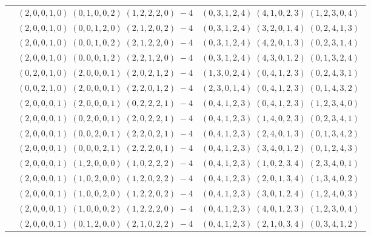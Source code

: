 \documentclass[11pt]{article}
\begin{document}
\begin{longtable}[l]{|c|c|c|}
 \cline{2-3} 
 & $(2 ,0 ,0 ,1 ,0) \;(0 ,1 ,0 ,0 ,2) \;(1 ,2 ,2 ,2 ,0) \;-4$ & $(0 ,3 ,1 ,2 ,4) \;(4 ,1 ,0 ,2 ,3) \;(1 ,2 ,3 ,0 ,4) \;$\\ 
 \cline{2-3} 
 & $(2 ,0 ,0 ,1 ,0) \;(0 ,0 ,1 ,2 ,0) \;(2 ,1 ,2 ,0 ,2) \;-4$ & $(0 ,3 ,1 ,2 ,4) \;(3 ,2 ,0 ,1 ,4) \;(0 ,2 ,4 ,1 ,3) \;$\\ 
 \cline{2-3} 
 & $(2 ,0 ,0 ,1 ,0) \;(0 ,0 ,1 ,0 ,2) \;(2 ,1 ,2 ,2 ,0) \;-4$ & $(0 ,3 ,1 ,2 ,4) \;(4 ,2 ,0 ,1 ,3) \;(0 ,2 ,3 ,1 ,4) \;$\\ 
 \cline{2-3} 
 & $(2 ,0 ,0 ,1 ,0) \;(0 ,0 ,0 ,1 ,2) \;(2 ,2 ,1 ,2 ,0) \;-4$ & $(0 ,3 ,1 ,2 ,4) \;(4 ,3 ,0 ,1 ,2) \;(0 ,1 ,3 ,2 ,4) \;$\\ 
 \cline{2-3} 
 & $(0 ,2 ,0 ,1 ,0) \;(2 ,0 ,0 ,0 ,1) \;(2 ,0 ,2 ,1 ,2) \;-4$ & $(1 ,3 ,0 ,2 ,4) \;(0 ,4 ,1 ,2 ,3) \;(0 ,2 ,4 ,3 ,1) \;$\\ 
 \cline{2-3} 
 & $(0 ,0 ,2 ,1 ,0) \;(2 ,0 ,0 ,0 ,1) \;(2 ,2 ,0 ,1 ,2) \;-4$ & $(2 ,3 ,0 ,1 ,4) \;(0 ,4 ,1 ,2 ,3) \;(0 ,1 ,4 ,3 ,2) \;$\\ 
 \cline{2-3} 
 & $(2 ,0 ,0 ,0 ,1) \;(2 ,0 ,0 ,0 ,1) \;(0 ,2 ,2 ,2 ,1) \;-4$ & $(0 ,4 ,1 ,2 ,3) \;(0 ,4 ,1 ,2 ,3) \;(1 ,2 ,3 ,4 ,0) \;$\\ 
 \cline{2-3} 
 & $(2 ,0 ,0 ,0 ,1) \;(0 ,2 ,0 ,0 ,1) \;(2 ,0 ,2 ,2 ,1) \;-4$ & $(0 ,4 ,1 ,2 ,3) \;(1 ,4 ,0 ,2 ,3) \;(0 ,2 ,3 ,4 ,1) \;$\\ 
 \cline{2-3} 
 & $(2 ,0 ,0 ,0 ,1) \;(0 ,0 ,2 ,0 ,1) \;(2 ,2 ,0 ,2 ,1) \;-4$ & $(0 ,4 ,1 ,2 ,3) \;(2 ,4 ,0 ,1 ,3) \;(0 ,1 ,3 ,4 ,2) \;$\\ 
 \cline{2-3} 
 & $(2 ,0 ,0 ,0 ,1) \;(0 ,0 ,0 ,2 ,1) \;(2 ,2 ,2 ,0 ,1) \;-4$ & $(0 ,4 ,1 ,2 ,3) \;(3 ,4 ,0 ,1 ,2) \;(0 ,1 ,2 ,4 ,3) \;$\\ 
 \cline{2-3} 
 & $(2 ,0 ,0 ,0 ,1) \;(1 ,2 ,0 ,0 ,0) \;(1 ,0 ,2 ,2 ,2) \;-4$ & $(0 ,4 ,1 ,2 ,3) \;(1 ,0 ,2 ,3 ,4) \;(2 ,3 ,4 ,0 ,1) \;$\\ 
 \cline{2-3} 
 & $(2 ,0 ,0 ,0 ,1) \;(1 ,0 ,2 ,0 ,0) \;(1 ,2 ,0 ,2 ,2) \;-4$ & $(0 ,4 ,1 ,2 ,3) \;(2 ,0 ,1 ,3 ,4) \;(1 ,3 ,4 ,0 ,2) \;$\\ 
 \cline{2-3} 
 & $(2 ,0 ,0 ,0 ,1) \;(1 ,0 ,0 ,2 ,0) \;(1 ,2 ,2 ,0 ,2) \;-4$ & $(0 ,4 ,1 ,2 ,3) \;(3 ,0 ,1 ,2 ,4) \;(1 ,2 ,4 ,0 ,3) \;$\\ 
 \cline{2-3} 
 & $(2 ,0 ,0 ,0 ,1) \;(1 ,0 ,0 ,0 ,2) \;(1 ,2 ,2 ,2 ,0) \;-4$ & $(0 ,4 ,1 ,2 ,3) \;(4 ,0 ,1 ,2 ,3) \;(1 ,2 ,3 ,0 ,4) \;$\\ 
 \cline{2-3} 
 & $(2 ,0 ,0 ,0 ,1) \;(0 ,1 ,2 ,0 ,0) \;(2 ,1 ,0 ,2 ,2) \;-4$ & $(0 ,4 ,1 ,2 ,3) \;(2 ,1 ,0 ,3 ,4) \;(0 ,3 ,4 ,1 ,2) \;$\\ 

\end{longtable}
\end{document}
